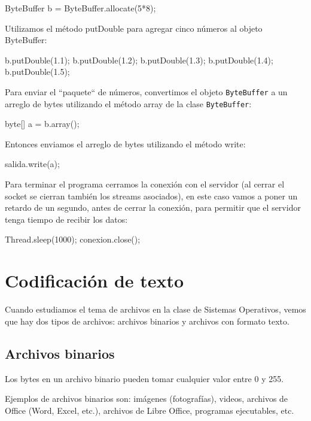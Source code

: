\begin{SourceCode}
ByteBuffer b = ByteBuffer.allocate(5*8);
\end{SourceCode}

Utilizamos el método putDouble para agregar cinco números al objeto ByteBuffer:

\begin{SourceCode}
b.putDouble(1.1);
b.putDouble(1.2);
b.putDouble(1.3);
b.putDouble(1.4);
b.putDouble(1.5);
\end{SourceCode}

Para enviar el ``paquete`` de números, convertimos el objeto \texttt{ByteBuffer} a un arreglo de bytes utilizando el método array de la clase \texttt{ByteBuffer}:

\begin{SourceCode}
byte[] a = b.array();
\end{SourceCode}

Entonces enviamos el arreglo de bytes utilizando el método write:

\begin{SourceCode}
salida.write(a);
\end{SourceCode}

Para terminar el programa cerramos la conexión con el servidor (al cerrar el socket se cierran también los streams asociados), en este caso vamos a poner un retardo de un segundo, antes de cerrar la conexión, para permitir que el servidor tenga tiempo de recibir los datos:

\begin{SourceCode}
Thread.sleep(1000);
conexion.close();
\end{SourceCode}

\chapter{Codificación de texto}

Cuando estudiamos el tema de archivos en la clase de Sistemas Operativos, vemos que hay dos tipos de archivos: archivos binarios y archivos con formato texto.

\section{Archivos binarios}

Los bytes en un archivo binario pueden tomar cualquier valor entre 0 y 255.

Ejemplos de archivos binarios son: imágenes (fotografías), videos, archivos de Office (Word, Excel, etc.), archivos de Libre Office, programas ejecutables, etc.

